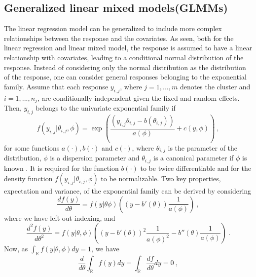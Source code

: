 \subsection{Generalized linear mixed models(GLMMs)}
The linear regression model can be generalized to include more complex relationships between the response and the covariates. 
As seen, both for the linear regression and linear mixed model, the response is assumed to have a linear relationship with covariates, leading to a conditional normal distribution of the response.
Instead of considering only the normal distribution as the distribution of the response, one can consider general responses belonging to the exponential family.
Assume that each response $y_{i, j}$, where $j =1, ..., m$ denotes the cluster and $i=1, ..., n_j$, are conditionally independent given the fixed and random effects.
Then, $y_{i, j}$ belongs to the univariate exponential family if
\begin{equation}
    f(y_{i, j} \lvert \theta_{i, j}, \phi) = \exp\left(\frac{(y_{i, j}\theta_{i, j} - b(\theta_{i, j}))}{a(\phi)} + c(y, \phi) \right) \ ,
\end{equation}
for some functions $a(\cdot), b(\cdot)$ and $c(\cdot)$, where $\theta_{i, j}$ is the parameter of the distribution, $\phi$ is a dispersion parameter and $\theta_{i, j}$ is a canonical parameter if $\phi$ is known \citep{GLMM_book_old}. 
It is required for the function $b(\cdot)$ to be twice differentiable and for the density function $f(y_{i, j} \lvert \theta_{i, j}, \phi)$ to be normalizable.
Two key properties, expectation and variance, of the exponential family can be derived by considering 
\begin{equation}
    \frac{d f(y)}{d\theta} = f(y \lvert \theta \phi) \left( (y-b'(\theta)) \frac{1}{a(\phi)} \right)  \ ,
\end{equation}
where we have left out indexing, and 
\begin{equation}
    \frac{d^2 f(y)}{d\theta^2} = f(y \lvert \theta, \phi) \left( (y-b'(\theta))^2 \frac{1}{a(\phi)^2} - b''(\theta)\frac{1}{a(\phi)} \right) \ .
\end{equation}
Now, as $\int_{\mathbb{R}} f(y \lvert \theta, \phi) dy = 1$, we have 
\begin{equation}
    \label{eq:expfam_expectation}
    \frac{d}{d \theta} \int_{\mathbb{R}} f(y) dy  = \int_{\mathbb{R}} \frac{d f}{d\theta} dy = 0 \ ,
\end{equation}
